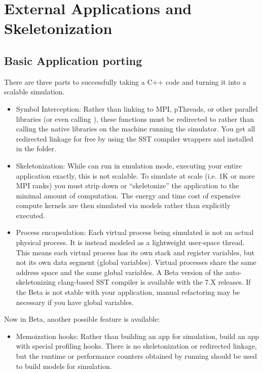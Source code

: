 
\chapter{External Applications and Skeletonization}
\label{chap:appsAndSkeletonization}

\section{Basic Application porting}
\label{sec:skel:basic}
There are three parts to successfully taking a C++ code and turning it into a scalable simulation.
\begin{itemize}
\item Symbol Interception: Rather than linking to MPI, pThreads, or other parallel libraries (or even calling ), these functions must be redirected to \sstmacro rather than calling the native libraries on the machine running the simulator.
You get all redirected linkage for free by using
the SST compiler wrappers  and  installed in the  folder.
\item Skeletonization: While \sstmacro can run in emulation mode, executing your entire application exactly, this is not scalable.  To simulate at scale (i.e. 1K or more MPI ranks) you must strip down or ``skeletonize'' the application to the minimal amount of computation.  The energy and time cost of expensive compute kernels are then simulated via models rather than explicitly executed. 
\item Process encapsulation: Each virtual process being simulated is not an actual physical process. It is instead modeled as a lightweight user-space thread.  This means each virtual process has its own stack and register variables, but not its own data segment (global variables).
Virtual processes share the same address space and the same global variables.  A Beta version of the auto-skeletonizing clang-based SST compiler is available with the 7.X releases. If the Beta is not stable with your application, manual refactoring may be necessary if you have global variables.
\end{itemize}

Now in Beta, another possible feature is available:
\begin{itemize}
\item Memoization hooks: Rather than building an app for simulation, build an app with special profiling hooks. There is no skeletonization or redirected linkage, but the runtime or performance counters obtained by running should be used to build models for simulation.
\end{itemize}

